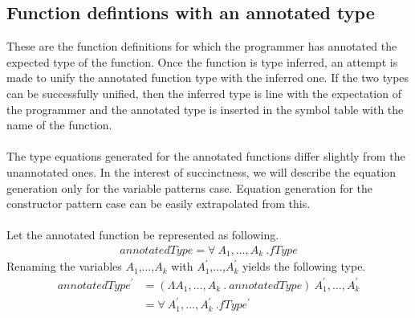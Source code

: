 \documentclass[11pt]{article}
\begin{document}
\subsection {Function defintions with an annotated type}
These are the function definitions for which the programmer has annotated the expected type of the function. Once the function is type inferred, an attempt is made to unify the annotated function type with the inferred one. If the two types can be successfully unified, then the inferred type is line with the expectation of the programmer and the annotated type is inserted in the symbol table with the name of the function.
~~\\~~\\ 
The type equations generated for the annotated functions differ slightly from the unannotated ones. In the interest of succinctness, we will describe the equation generation only for the variable patterns case. Equation generation for the constructor pattern case can be easily extrapolated from this.
~~\\~~\\
Let the annotated function be represented as following.
\begin {align*}
annotatedType = \forall~A_1,\ldots,A_k~.fType
\end {align*}
Renaming the variables $A_1$,$\ldots$,$A_k$ with $A_1^\prime$,$\ldots$,$A_{k}^\prime$ yields the following type.
\begin {align*}
annotatedType^\prime &= (\Lambda A_1,\ldots,A_k~.~annotatedType)~
                   A_1^\prime,\ldots,A_k^\prime \\
                &= \forall~A_1^\prime,\ldots,A_k^\prime~.fType^\prime
\end {align*}
\end{document}

